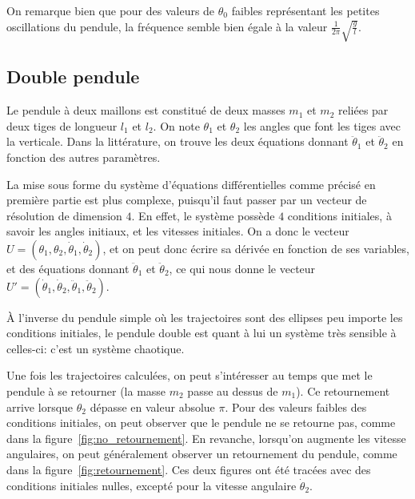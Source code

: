 On remarque bien que pour des valeurs de $ \theta_0 $ faibles représentant les petites oscillations du pendule, 
la fréquence semble bien égale à la valeur $ \frac{1}{2 \pi} \sqrt{\frac{g}{l}} $.

\subsection{Double pendule}
Le pendule à deux maillons est constitué de deux masses $ m_1 $ et $ m_2 $ 
reliées par deux tiges de longueur $ l_1 $ et $ l _2 $. On note $ \theta_1 $ et $ \theta_2 $ les angles
que font les tiges avec la verticale. Dans la littérature, on trouve les deux équations donnant $\ddot \theta_1$ et $\ddot \theta_2$ en fonction des autres paramètres.

La mise sous forme du système d'équations différentielles comme précisé en première partie est plus complexe,
puisqu'il faut passer par un vecteur de résolution de dimension $4$.
En effet, le système possède $4$ conditions initiales, à savoir les angles initiaux, et les vitesses initiales.
On a donc le vecteur $ U = (\theta_1, \theta_2, \dot \theta_1, \dot \theta_2) $, et on peut donc écrire sa dérivée en fonction de ses variables, et des équations donnant $\ddot \theta_1$ et $\ddot \theta_2$,
ce qui nous donne le vecteur $ U' = (\dot \theta_1, \dot \theta_2, \ddot \theta_1, \ddot \theta_2) $.

À l'inverse du pendule simple où les trajectoires sont des ellipses peu importe les conditions initiales, 
le pendule double est quant à lui un système très sensible à celles-ci: c'est un système chaotique.  

\medbreak

Une fois les trajectoires calculées, on peut s'intéresser au temps que met le pendule à se retourner (la masse $ m_2 $ passe au
dessus de $ m_1 $).
Ce retournement arrive lorsque $ \theta_2 $ dépasse en valeur absolue $ \pi $.
Pour des valeurs faibles des conditions initiales, on peut observer que le pendule ne se retourne pas, comme dans la figure~\ref{fig:no_retournement}.
En revanche, lorsqu'on augmente les vitesse angulaires, on peut généralement observer un retournement du pendule, comme dans la figure~\ref{fig:retournement}.
Ces deux figures ont été tracées avec des conditions initiales nulles, excepté pour la vitesse angulaire $ \dot \theta_2 $.


